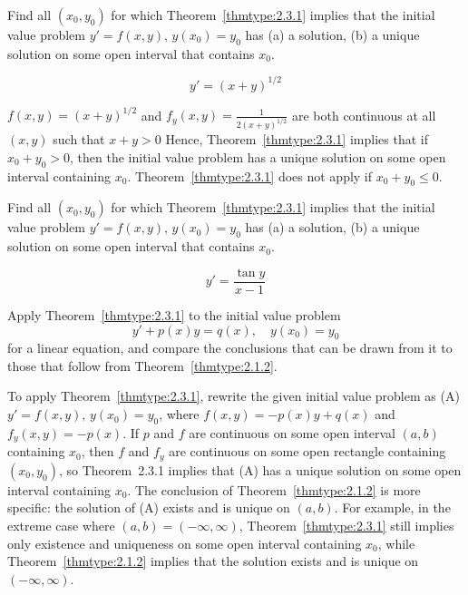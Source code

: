 \documentclass{ximera}
\begin{document}
\begin{problem}\label{exer:2.3.12} Find all $(x_0,y_0)$ for
which Theorem~\ref{thmtype:2.3.1}
implies that the initial value problem $y'=f(x,y),\,  y(x_0)=y_0$ has
(a) a solution, (b) a  unique solution on some open interval that contains $x_0$.

$$y'=(x+y)^{1/2}$$



\begin{solution}
    $f(x,y)=(x+y)^{1/2}$ and $f_y(x,y)=\frac{1}{2(x+y)^{1/2}}$ are both
continuous at all $(x,y)$ such that $x+y>0$ Hence,
 Theorem~\ref{thmtype:2.3.1} implies that if $x_0+y_0>0$, then the initial
value problem has a
 unique solution on some open interval containing  $x_0$.
 Theorem~\ref{thmtype:2.3.1} does not apply if $x_0+y_0\leq 0$.
\end{solution}
\end{problem}


\begin{problem}\label{exer:2.3.13}Find all $(x_0,y_0)$ for
which Theorem~\ref{thmtype:2.3.1}
implies that the initial value problem $y'=f(x,y),\,  y(x_0)=y_0$ has
(a) a solution, (b) a  unique solution on some open interval that contains $x_0$.

$$y'=\frac{\tan y}{x-1}$$
\end{problem}

\begin{problem}\label{exer:2.3.14}
Apply Theorem~\ref{thmtype:2.3.1} to the initial value problem
$$
y'+p(x)y = q(x), \quad y(x_0)=y_0
$$
for a linear equation, and compare the conclusions that can be drawn
from it to those that follow from Theorem~\ref{thmtype:2.1.2}.



\begin{solution}
    To apply  Theorem~\ref{thmtype:2.3.1}, rewrite the given initial value problem
as (A) $y'=f(x,y),\, y(x_0)=y_0$, where $f(x,y)=-p(x)y+q(x)$ and
$f_y(x,y)=-p(x)$. If $p$ and $f$ are continuous on some open interval
$(a,b)$ containing $x_0$, then $f$ and $f_y$ are continuous on some
open
rectangle containing $(x_0,y_0)$, so  Theorem~2.3.1 implies
that (A) has a unique solution  on some open
interval
containing $x_0$. The conclusion of Theorem~\ref{thmtype:2.1.2} is more
specific:
the solution of (A) exists and is unique on $(a,b)$. For example, in
the extreme case where $(a,b)=(-\infty,\infty)$,  Theorem~\ref{thmtype:2.3.1}
still implies only existence and uniqueness on some open
interval containing $x_0$, while  Theorem~\ref{thmtype:2.1.2} implies that the
solution exists and is unique on $(-\infty,\infty)$.
\end{solution}
\end{problem}
\end{document}
